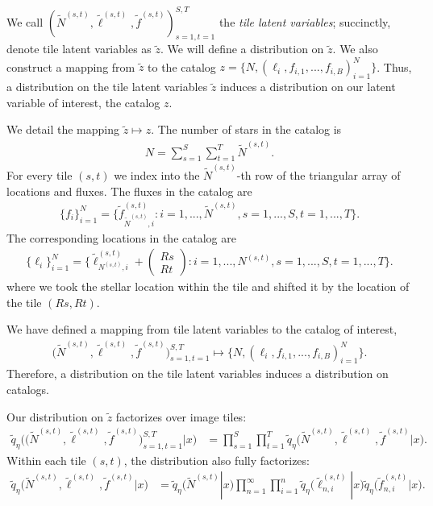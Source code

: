 We call $(\tilde N^{(s, t)}, \tilde \ell^{(s, t)}, \tilde f^{(s, t)})_{s=1,t=1}^{S,T}$ the {\itshape tile latent variables}; 
succinctly, denote tile latent variables as $\tilde z$. 
We will define a distribution on $\tilde z$. 
We also construct a mapping from $\tilde z$ to 
the catalog $z = \{N, (\ell_i, f_{i,1}, ..., f_{i,B})_{i = 1}^N\}$. Thus, a distribution 
on the tile latent variables $\tilde z$ induces 
a distribution on our latent variable of interest, the catalog $z$. 

We detail the mapping $\tilde z\mapsto z$. 
The number of stars in the catalog is 
\begin{align}
    N = \sum_{s=1}^{S}\sum_{t=1}^T \tilde N^{(s, t)}. 
\end{align}
For every tile $(s,t)$ we index into the $\tilde N^{(s,t)}$-th
row of the triangular array of locations and fluxes. 
The fluxes in the catalog are
\begin{align}
    \{f_i\}_{i=1}^N = \Big\{\tilde f_{\tilde N^{(s, t)}, i}^{(s, t)} : i = 1, ..., \tilde N^{(s, t)}, s = 1, ..., S, t = 1, ..., T \Big\}.
\end{align}
The corresponding locations in the catalog are 
\begin{align}
    \{\ell_i\}_{i = 1}^N = \Big\{\tilde \ell_{N^{(s, t)}, i}^{(s, t)} + 
    \begin{pmatrix}
    Rs \\ Rt
    \end{pmatrix} 
    : i = 1, ..., N^{(s, t)}, s = 1, ..., S, t = 1, ..., T\Big\}.
\end{align}
where we took the stellar location within the tile and shifted it by the location of the tile $(Rs, Rt)$. 

We have defined a mapping from tile latent variables to the catalog of interest, 
\begin{align}
 \big(\tilde N^{(s, t)}, \tilde \ell^{(s, t)}, \tilde f^{(s, t)}\big)_{s=1, t = 1}^{S, T}
\mapsto     
\{N, (\ell_i, f_{i,1}, ..., f_{i,B})_{i = 1}^N\}.
\label{eq:patch_to_full_map}
\end{align}
Therefore, a distribution on the tile latent variables induces a distribution on catalogs. 

Our distribution on $\tilde z$ factorizes over image tiles:
\begin{align}
    \tilde q_\eta\big( \big(\tilde N^{(s, t)}, \tilde \ell^{(s, t)}, \tilde f^{(s, t)}\big)_{s=1, t = 1}^{S, T}|x\big) 
    &=
    \prod_{s = 1}^S \prod_{t=1}^T
    \tilde q_\eta\big(\tilde N^{(s, t)}, \tilde \ell^{(s, t)}, \tilde f^{(s, t)} | x\big).
    \label{eq:factorize_patches}
\end{align}
Within each tile $(s,t)$, the distribution also fully factorizes: 
\begin{align}
    \tilde q_\eta\big(\tilde N^{(s, t)}, \tilde \ell^{(s, t)}, \tilde f^{(s, t)} | x\big)
    &= 
    \tilde q_\eta\big(\tilde N^{(s, t)} | x\big)
    \prod_{n = 1}^\infty \prod_{i = 1}^n 
    \tilde q_\eta\big(\tilde \ell_{n,i}^{(s, t)} | x\big)
    \tilde q_\eta\big(\tilde f_{n,i}^{(s, t)} | x\big).
    \label{eq:factorize_within_patch}
\end{align}

